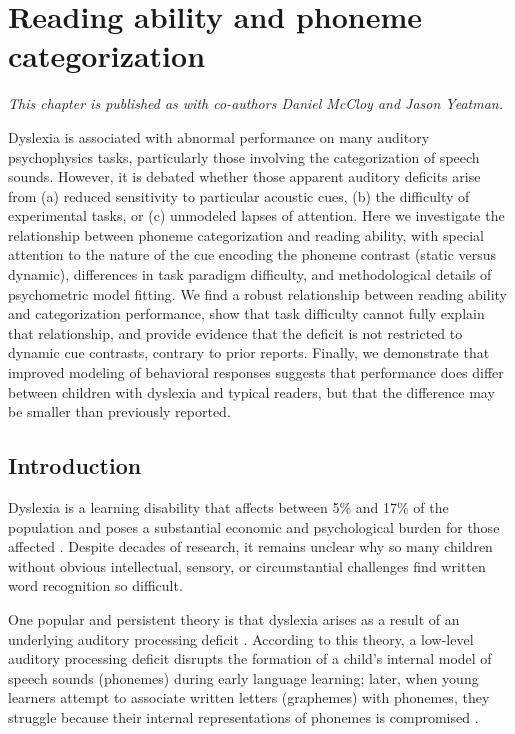 \documentclass[../uwthesis.tex]{subfiles}
\begin{document}
\chapter{Reading ability and phoneme categorization}
\emph{This chapter is published as \citep{OBrien2018} with co-authors Daniel McCloy and Jason Yeatman.}

 
Dyslexia is associated with abnormal performance on many auditory psychophysics tasks, particularly those involving the categorization of speech sounds. However, it is debated whether those apparent auditory deficits arise from (a) reduced sensitivity to particular acoustic cues, (b) the difficulty of experimental tasks, or (c) unmodeled lapses of attention. Here we investigate the relationship between phoneme categorization and reading ability, with special attention to the nature of the cue encoding the phoneme contrast (static versus dynamic), differences in task paradigm difficulty, and methodological details of psychometric model fitting. We find a robust relationship between reading ability and categorization performance, show that task difficulty cannot fully explain that relationship, and provide evidence that the deficit is not restricted to dynamic cue contrasts, contrary to prior reports. Finally, we demonstrate that improved modeling of behavioral responses suggests that performance does differ between children with dyslexia and typical readers, but that the difference may be smaller than previously reported.
 
\section{Introduction}

Dyslexia is a learning disability that affects between 5\% and 17\% of the population and poses a substantial economic and psychological burden for those affected \citep{Lyon2003,Shaywitz1998,Snowling2000}. Despite decades of research, it remains unclear why so many children without obvious intellectual, sensory, or circumstantial challenges find written word recognition so difficult.

One popular and persistent theory is that dyslexia arises as a result of an underlying auditory processing deficit \citep{Farmer1995,Goswami2011,VanIngelghem2005,Snowling1998,Steinbrink2014,Tallal1980}. According to this theory, a low-level auditory processing deficit disrupts the formation of a child's internal model of speech sounds (phonemes) during early language learning; later, when young learners attempt to associate written letters (graphemes) with phonemes, they struggle because their internal representations of phonemes is compromised \citep{Poelmans2011}. 
\end{document}
